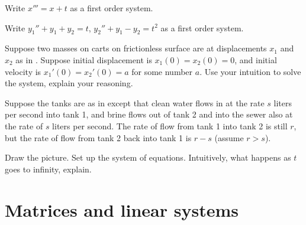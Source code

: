 \begin{exercise}
Write $x''' = x+t$ as a first order system.
\end{exercise}

\begin{exercise}
Write $y_1'' + y_1 + y_2 = t$, 
$y_2'' + y_1 - y_2 = t^2$ as a first order system.
\end{exercise}

\begin{exercise}
Suppose two masses on carts on frictionless surface are at 
displacements $x_1$ and $x_2$ as in .
Suppose initial displacement is $x_1(0)=x_2(0)=0$, and initial velocity is $x_1'(0) = x_2'(0) = a$ for some number $a$.
Use your intuition
to solve the system, explain your reasoning.
\end{exercise}

\begin{exercise}
Suppose the tanks are as in 
 except that clean water flows in
at the rate $s$ liters per second into tank 1, and brine flows out of tank 2
and into the sewer also at the rate of $s$ liters per second.
The rate of flow from tank 1 into tank 2 is still $r$, but the rate of flow
from tank 2 back into tank 1 is $r-s$ (assume $r > s$).
\begin{tasks}
\task Draw the picture.
\task Set up the system of equations.
\task Intuitively, what happens as $t$ goes to infinity, explain.
\end{tasks}
\end{exercise}


\sectionnewpage
\section{Matrices and linear systems} \label{sec:matrix}



